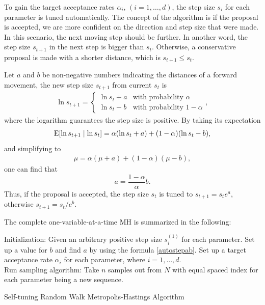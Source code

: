 To gain the target acceptance rates $\alpha_i$, $(i = 1, \dots, d)$, the step size $s_i$ for each parameter is tuned automatically. The concept of the algorithm is if the proposal is accepted, we are more confident on the direction and step size that were made. In this scenario, the next moving step should be further. In another word, the step size $s_{t+1}$ in the next step is bigger than $s_t$. Otherwise, a conservative proposal is made with a shorter distance, which is $s_{t+1}\leq s_t$. 

Let $a$ and $b$ be non-negative numbers indicating the distances of a forward movement, the new step size $s_{t+1}$ from current $s_t$ is 
\begin{align}\ln s_{t+1} = 
\begin{cases}
\ln s_t + a & \mbox{with probability } \alpha \\
\ln s_t - b & \mbox{with probability } 1 - \alpha 
\end{cases},
\end{align}
where the logarithm guarantees the step size is positive. 
By taking its expectation  
\begin{align}
\mathrm{E}\lbrack\ln s_{t+1}\mid \ln s_t\rbrack = \alpha(\ln s_t+a) + (1-\alpha)(\ln s_t-b), 
\end{align}
and simplifying to 
\begin{align}
\mu= \alpha(\mu+a) + (1-\alpha)(\mu-b), 
\end{align}
one can find that 
\begin{equation}\label{autostepab}
a = \frac{1-\alpha}{\alpha}  b. 
\end{equation}
Thus, if the proposal is accepted, the step size $s_t$ is tuned to $s_{t+1}=s_te^a$, otherwise $s_{t+1}=s_t/e^b$. 

The complete one-variable-at-a-time MH is summarized in the following: 
\begin{algorithm}[h]
Initialization: Given an arbitrary positive step size $s_i^{(1)}$ for each parameter. Set up a value for $b$ and find $a$ by using the formula \eqref{autostepab}. Set up a target acceptance rate $\alpha_i$ for each parameter, where $i = 1,\dots, d$. \\
Run sampling algorithm: 
Take $n$ samples out from $N$ with equal spaced index for each parameter being a new sequence. 
\caption{Self-tuning Random Walk Metropolis-Hastings Algorithm}\label{algoonevarible}
\end{algorithm}


